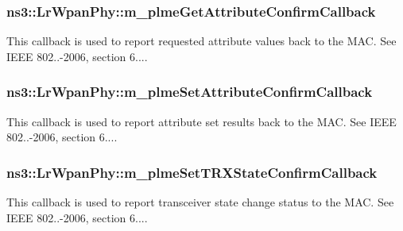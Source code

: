 \subsubsection[{\texorpdfstring{m\+\_\+plme\+Get\+Attribute\+Confirm\+Callback}{m_plmeGetAttributeConfirmCallback}}]{ ns3\+::\+Lr\+Wpan\+Phy\+::m\+\_\+plme\+Get\+Attribute\+Confirm\+Callback\hspace{0.3cm}{\ttfamily [private]}}\hypertarget{classns3_1_1LrWpanPhy_abc174686fae5652243dca022df5af6ed}{}\label{classns3_1_1LrWpanPhy_abc174686fae5652243dca022df5af6ed}
This callback is used to report requested attribute values back to the M\+AC. See I\+E\+EE 802..-\/2006, section 6.... 
\subsubsection[{\texorpdfstring{m\+\_\+plme\+Set\+Attribute\+Confirm\+Callback}{m_plmeSetAttributeConfirmCallback}}]{ ns3\+::\+Lr\+Wpan\+Phy\+::m\+\_\+plme\+Set\+Attribute\+Confirm\+Callback\hspace{0.3cm}{\ttfamily [private]}}\hypertarget{classns3_1_1LrWpanPhy_a174646782f62d874a5c92f4cfbbb8922}{}\label{classns3_1_1LrWpanPhy_a174646782f62d874a5c92f4cfbbb8922}
This callback is used to report attribute set results back to the M\+AC. See I\+E\+EE 802..-\/2006, section 6.... 
\subsubsection[{\texorpdfstring{m\+\_\+plme\+Set\+T\+R\+X\+State\+Confirm\+Callback}{m_plmeSetTRXStateConfirmCallback}}]{ ns3\+::\+Lr\+Wpan\+Phy\+::m\+\_\+plme\+Set\+T\+R\+X\+State\+Confirm\+Callback\hspace{0.3cm}{\ttfamily [private]}}\hypertarget{classns3_1_1LrWpanPhy_ab3fed0e994f9e51e765c704f1a7b666f}{}\label{classns3_1_1LrWpanPhy_ab3fed0e994f9e51e765c704f1a7b666f}
This callback is used to report transceiver state change status to the M\+AC. See I\+E\+EE 802..-\/2006, section 6.... 
